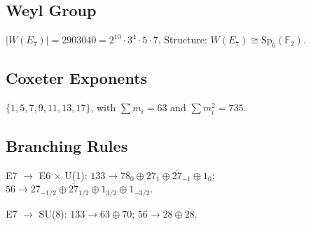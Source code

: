 \documentclass[11pt,a4paper]{article}
\begin{document}
\subsection{Weyl Group}

$|W(E_7)| = 2903040 = 2^{10} \cdot 3^4 \cdot 5 \cdot 7$. Structure: $W(E_7) \cong \text{Sp}_6(\mathbb{F}_2)$.

\subsection{Coxeter Exponents}

$\{1, 5, 7, 9, 11, 13, 17\}$, with $\sum m_i = 63$ and $\sum m_i^2 = 735$.

\subsection{Branching Rules}

E7 $\to$ E6 $\times$ U(1): $133 \to 78_0 \oplus 27_1 \oplus \overline{27}_{-1} \oplus 1_0$; $56 \to 27_{-1/2} \oplus \overline{27}_{1/2} \oplus 1_{3/2} \oplus 1_{-3/2}$.

E7 $\to$ SU(8): $133 \to 63 \oplus 70$; $56 \to 28 \oplus \overline{28}$.
\end{document}

